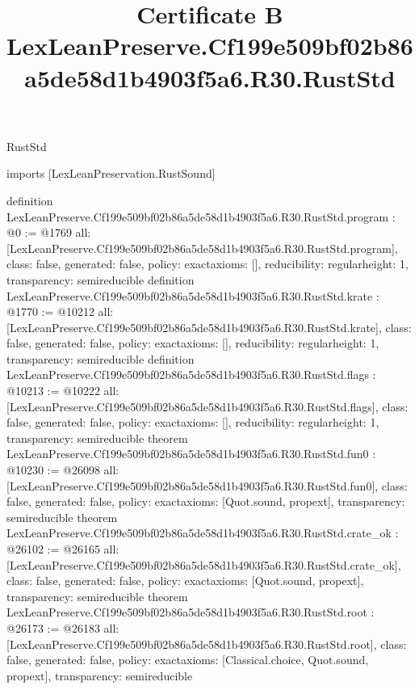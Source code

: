 \begin{lexlean}{RustStd}
\title{Certificate B LexLeanPreserve.Cf199e509bf02b86a5de58d1b4903f5a6.R30.RustStd}
\begin{coremodule}
imports [LexLeanPreservation.RustSound]

definition LexLeanPreserve.Cf199e509bf02b86a5de58d1b4903f5a6.R30.RustStd.program : @0 := @1769 {
  all: [LexLeanPreserve.Cf199e509bf02b86a5de58d1b4903f5a6.R30.RustStd.program],
  class: false,
  generated: false,
  policy: exact{axioms: []},
  reducibility: regular{height: 1},
  transparency: semireducible
}
definition LexLeanPreserve.Cf199e509bf02b86a5de58d1b4903f5a6.R30.RustStd.krate : @1770 := @10212 {
  all: [LexLeanPreserve.Cf199e509bf02b86a5de58d1b4903f5a6.R30.RustStd.krate],
  class: false,
  generated: false,
  policy: exact{axioms: []},
  reducibility: regular{height: 1},
  transparency: semireducible
}
definition LexLeanPreserve.Cf199e509bf02b86a5de58d1b4903f5a6.R30.RustStd.flags : @10213 := @10222 {
  all: [LexLeanPreserve.Cf199e509bf02b86a5de58d1b4903f5a6.R30.RustStd.flags],
  class: false,
  generated: false,
  policy: exact{axioms: []},
  reducibility: regular{height: 1},
  transparency: semireducible
}
theorem LexLeanPreserve.Cf199e509bf02b86a5de58d1b4903f5a6.R30.RustStd.fun0 : @10230 := @26098 {
  all: [LexLeanPreserve.Cf199e509bf02b86a5de58d1b4903f5a6.R30.RustStd.fun0],
  class: false,
  generated: false,
  policy: exact{axioms: [Quot.sound, propext]},
  transparency: semireducible
}
theorem LexLeanPreserve.Cf199e509bf02b86a5de58d1b4903f5a6.R30.RustStd.crate_ok : @26102 := @26165 {
  all: [LexLeanPreserve.Cf199e509bf02b86a5de58d1b4903f5a6.R30.RustStd.crate_ok],
  class: false,
  generated: false,
  policy: exact{axioms: [Quot.sound, propext]},
  transparency: semireducible
}
theorem LexLeanPreserve.Cf199e509bf02b86a5de58d1b4903f5a6.R30.RustStd.root : @26173 := @26183 {
  all: [LexLeanPreserve.Cf199e509bf02b86a5de58d1b4903f5a6.R30.RustStd.root],
  class: false,
  generated: false,
  policy: exact{axioms: [Classical.choice, Quot.sound, propext]},
  transparency: semireducible
}


\end{coremodule}
\end{lexlean}
